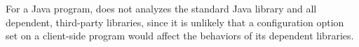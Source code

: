 


For a Java program, \ourtool does not analyzes the standard Java
library and all dependent, third-party libraries, since it is
unlikely that a configuration option set on a client-side
program would affect the behaviors of its dependent libraries.

